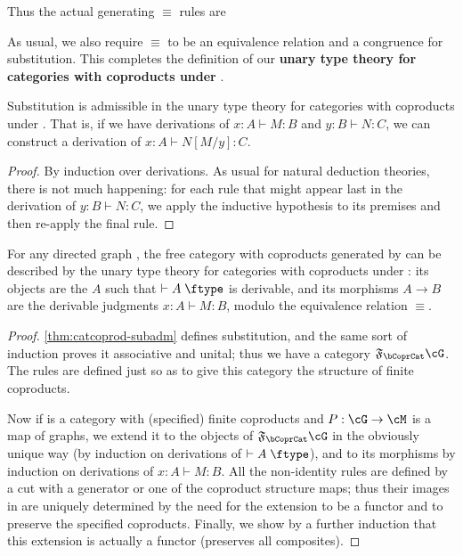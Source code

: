 \documentclass{book}
\let\types\vdash
\def\type{\;\ftype}
\newcommand{\F}[1]{\mathfrak{F}_{#1}}
\def\inl{\mathsf{inl}}
\def\inr{\mathsf{inr}}
\def\case{\mathsf{match}_+}
\begin{document}
Thus the actual generating $\equiv$ rules are
As usual, we also require $\equiv$ to be an equivalence relation and a congruence for substitution.
This completes the definition of our \textbf{unary type theory for categories with coproducts under \cG}.

\begin{lem}\label{thm:catcoprod-subadm}
  Substitution is admissible in the unary type theory for categories with coproducts under \cG.
  That is, if we have derivations of $x:A\types M:B$ and $y:B\types N:C$, we can construct a derivation of $x:A\types N[M/y]:C$.
\end{lem}
\begin{proof}
  By induction over derivations.
  As usual for natural deduction theories, there is not much happening: for each rule that might appear last in the derivation of $y:B\types N:C$, we apply the inductive hypothesis to its premises and then re-apply the final rule.
\end{proof}

\begin{thm}\label{thm:catcoprod-initial}
  For any directed graph \cG, the free category with coproducts generated by \cG can be described by the unary type theory for categories with coproducts under \cG: its objects are the $A$ such that $\types A\type$ is derivable, and its morphisms $A\to B$ are the derivable judgments $x:A\types M:B$, modulo the equivalence relation $\equiv$.
\end{thm}
\begin{proof}
  \cref{thm:catcoprod-subadm} defines substitution, and the same sort of induction proves it associative and unital; thus we have a category $\F\bCoprCat\cG$.
  The rules are defined just so as to give this category the structure of finite coproducts.

  Now if \cM is a category with (specified) finite coproducts and $P:\cG\to\cM$ is a map of graphs, we extend it to the objects of $\F\bCoprCat\cG$ in the obviously unique way (by induction on derivations of $\types A\type$), and to its morphisms by induction on derivations of $x:A\types M:B$.
  All the non-identity rules are defined by a cut with a generator or one of the coproduct structure maps; thus their images in \cM are uniquely determined by the need for the extension to be a functor and to preserve the specified coproducts.
  Finally, we show by a further induction that this extension is actually a functor (preserves all composites).
\end{proof}
\end{document}
